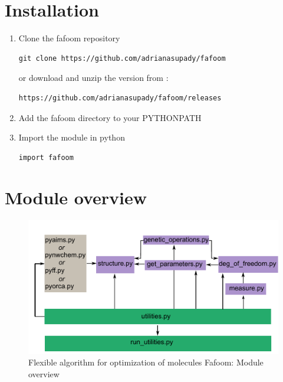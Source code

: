 \documentclass[a4paper]{article}
\begin{document}
\section{Installation}

\begin{enumerate}
\item Clone the fafoom repository
\begin{verbatim}
git clone https://github.com/adrianasupady/fafoom
\end{verbatim}
or download and unzip the version from :
 \begin{verbatim}
https://github.com/adrianasupady/fafoom/releases
\end{verbatim}
\item Add the fafoom directory to your PYTHONPATH
\item Import the module in python
\begin{verbatim}
import fafoom
\end{verbatim}
\end{enumerate}

\section{Module overview}


\begin{figure}[h!]
  \caption{Flexible algorithm for optimization of molecules Fafoom:  Module overview}
  \centering
    \includegraphics[width=1.0\textwidth]{fafoom_module_overview.pdf}
\end{figure}
\end{document}
